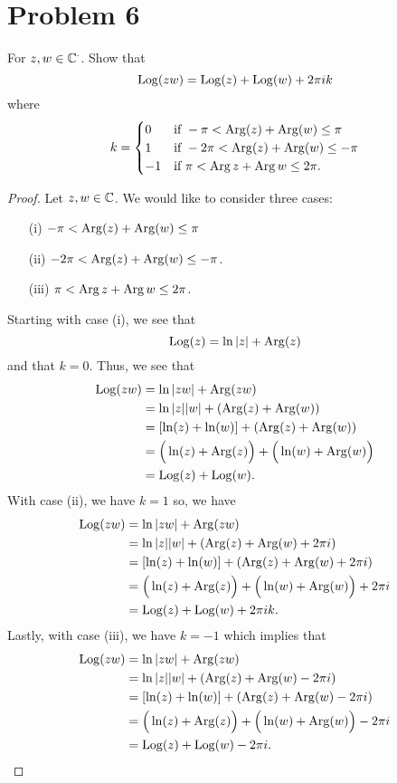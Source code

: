 \documentclass[a4paper]{article}
\begin{document}
\section*{Problem 6}

For \( z,w \in \mathbb{C}^{\cdot} \). Show that 
\[  \operatorname{Log}(zw) = \operatorname{Log}(z) + \operatorname{Log}(w) + 2 \pi i k  \]
where 
\[  k = 
\begin{cases}
    0 &\text{if} \ - \pi < \operatorname{Arg}(z) + \operatorname{Arg}(w) \leq \pi \\ 
    1 &\text{if} \ -2 \pi < \operatorname{Arg}(z) + \operatorname{Arg}(w) \leq - \pi \\
    -1 &\text{if} \ \pi < \operatorname{Arg} z + \operatorname{Arg} w \leq 2 \pi.
\end{cases} \]
\begin{proof}
Let \( z,w \in \mathbb{C}  \). We would like to consider three cases: 
    \begin{enumerate}
        \item[(i)] \( - \pi < \operatorname{Arg}(z) + \operatorname{Arg}(w) \leq \pi \)
        \item[(ii)] \( -2 \pi < \operatorname{Arg}(z) + \operatorname{Arg}(w) \leq - \pi \).
        \item[(iii)] \( \pi < \operatorname{Arg} z + \operatorname{Arg} w \leq 2 \pi \). 
    \end{enumerate}
Starting with case (i), we see that
\[  \operatorname{Log}(z) = \ln | z |  + \operatorname{Arg}(z) \]
and that \( k = 0  \). Thus, we see that 
\begin{align*}
    \operatorname{Log}(zw) &= \ln | zw |  + \operatorname{Arg}(zw) \\
             &= \ln | z | | w |  + (\operatorname{Arg}(z) + \operatorname{Arg}(w) ) \\
             &= [\ln(z) + \ln(w)] + (\operatorname{Arg}(z) + \operatorname{Arg}(w) )\\  
             &= \Big(  \ln(z) + \operatorname{Arg}(z)  \Big) + \Big(  \ln(w) + \operatorname{Arg}(w) \Big)\\
             &= \operatorname{Log}(z) + \operatorname{Log}(w). 
\end{align*}
With case (ii), we have \( k = 1  \) so, we have
\begin{align*}
    \operatorname{Log}(zw) &= \ln | zw |  + \operatorname{Arg}(zw) \\
             &= \ln | z | | w |  + (\operatorname{Arg}(z) + \operatorname{Arg}(w) + 2\pi i ) \\
             &= [\ln(z) + \ln(w)] + (\operatorname{Arg}(z) + \operatorname{Arg}(w) + 2\pi i )\\  
             &= \Big(  \ln(z) + \operatorname{Arg}(z)  \Big) + \Big(  \ln(w) + \operatorname{Arg}(w) \Big) + 2\pi i   \\
             &= \operatorname{Log}(z) + \operatorname{Log}(w) + 2\pi i k. 
\end{align*}
Lastly, with case (iii), we have \( k = -1 \) which implies that 
\begin{align*}
    \operatorname{Log}(zw) &= \ln | zw |  + \operatorname{Arg}(zw) \\
             &= \ln | z | | w |  + (\operatorname{Arg}(z) + \operatorname{Arg}(w) - 2\pi i ) \\
             &= [\ln(z) + \ln(w)] + (\operatorname{Arg}(z) + \operatorname{Arg}(w) - 2\pi i )\\  
             &= \Big(  \ln(z) + \operatorname{Arg}(z)  \Big) + \Big(  \ln(w) + \operatorname{Arg}(w) \Big) - 2\pi i   \\
             &= \operatorname{Log}(z) + \operatorname{Log}(w) - 2\pi i . 
\end{align*}

\end{proof}
\end{document}
